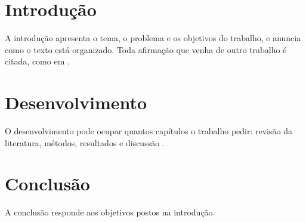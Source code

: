\documentclass[dsc,pdfa]{ufrj}
\begin{document}
  \mainmatter

  \chapter{Introdução}

  A introdução apresenta o tema, o problema e os objetivos do trabalho, e
  anuncia como o texto está organizado. Toda afirmação que venha de outro
  trabalho é citada, como em \citet{book-example}.

  \chapter{Desenvolvimento}

  O desenvolvimento pode ocupar quantos capítulos o trabalho pedir: revisão
  da literatura, métodos, resultados e discussão \citep{article-example}.

  \chapter{Conclusão}

  A conclusão responde aos objetivos postos na introdução.

  \backmatter

  \printbibliography
\end{document}
